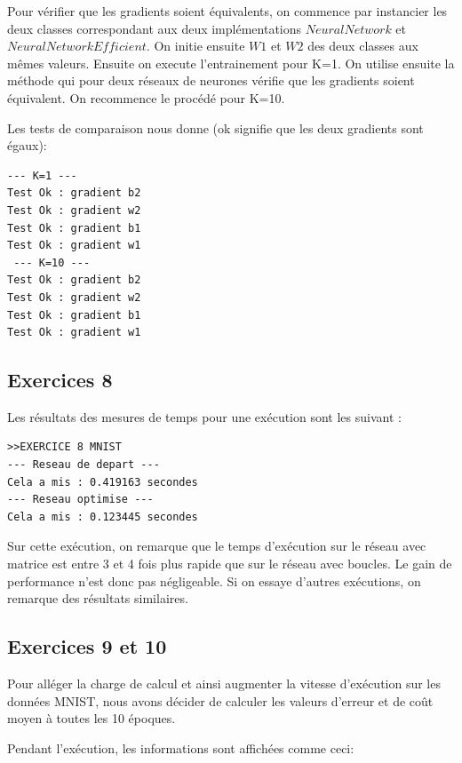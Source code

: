 \documentclass[a4paper,11pt]{article}
\begin{document}
Pour vérifier que les gradients soient équivalents, on commence par instancier les deux classes correspondant aux deux implémentations $NeuralNetwork$ et $NeuralNetworkEfficient$. On initie ensuite $W1$ et $W2$ des deux classes aux mêmes valeurs. Ensuite on execute l'entrainement pour K=1. On utilise ensuite la méthode qui pour deux réseaux de neurones vérifie que les gradients soient équivalent. On recommence le procédé pour K=10.

Les tests de comparaison nous donne (ok signifie que les deux gradients sont égaux):

\begin{verbatim}
--- K=1 ---
Test Ok : gradient b2
Test Ok : gradient w2
Test Ok : gradient b1
Test Ok : gradient w1
 --- K=10 ---
Test Ok : gradient b2
Test Ok : gradient w2
Test Ok : gradient b1
Test Ok : gradient w1
\end{verbatim}


\subsection{Exercices 8}

Les résultats des mesures de temps pour une exécution sont les suivant : 

\begin{verbatim}
>>EXERCICE 8 MNIST
--- Reseau de depart ---
Cela a mis : 0.419163 secondes
--- Reseau optimise ---
Cela a mis : 0.123445 secondes
\end{verbatim}

Sur cette exécution, on remarque que le temps d'exécution sur le réseau avec matrice est entre 3 et 4 fois plus rapide que sur le réseau avec boucles. Le gain de performance n'est donc pas négligeable. Si on essaye d'autres exécutions, on remarque des résultats similaires.

\subsection{Exercices 9 et 10}

Pour alléger la charge de calcul et ainsi augmenter la vitesse d'exécution sur les données MNIST, nous avons décider de calculer les valeurs d'erreur et de coût moyen à toutes les 10 époques.

Pendant l'exécution, les informations sont affichées comme ceci:
\end{document}
